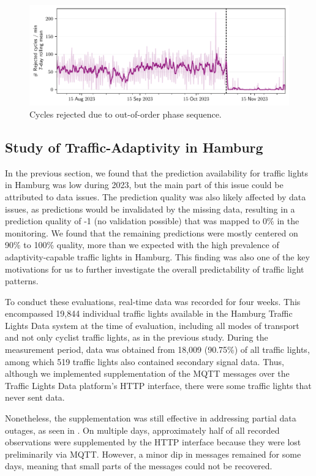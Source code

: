 \begin{figure}[t]
    \centering
    \includegraphics[width=\linewidth]{images/monitoring-rejected-cycles.pdf}
    \caption{Cycles rejected due to out-of-order phase sequence.}\label{fig:monitoring-rejected-cycles}
\end{figure}

\subsection{Study of Traffic-Adaptivity in Hamburg}

In the previous section, we found that the prediction availability for traffic lights in Hamburg was low during 2023, but the main part of this issue could be attributed to data issues. The prediction quality was also likely affected by data issues, as predictions would be invalidated by the missing data, resulting in a prediction quality of -1 (no validation possible) that was mapped to 0\% in the monitoring. We found that the remaining predictions were mostly centered on 90\% to 100\% quality, more than we expected with the high prevalence of adaptivity-capable traffic lights in Hamburg. This finding was also one of the key motivations for us to further investigate the overall predictability of traffic light patterns. 

To conduct these evaluations, real-time data was recorded for four weeks. This encompassed 19,844 individual traffic lights available in the Hamburg Traffic Lights Data system at the time of evaluation, including all modes of transport and not only cyclist traffic lights, as in the previous study. During the measurement period, data was obtained from 18,009 (90.75\%) of all traffic lights, among which 519 traffic lights also contained secondary signal data. Thus, although we implemented supplementation of the MQTT messages over the Traffic Lights Data platform's HTTP interface, there were some traffic lights that never sent data.

Nonetheless, the supplementation was still effective in addressing partial data outages, as seen in . On multiple days, approximately half of all recorded observations were supplemented by the HTTP interface because they were lost preliminarily via MQTT. However, a minor dip in messages remained for some days, meaning that small parts of the messages could not be recovered.


